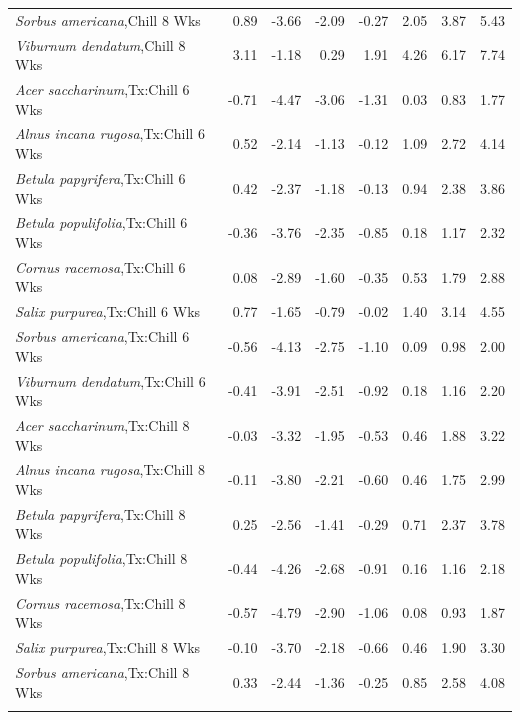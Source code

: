 \documentclass{article}\usepackage[]{graphicx}\usepackage[]{color}
\begin{document}
\begin{longtable}{lrrrrrrr}
  \textit{Sorbus americana},Chill 8 Wks & 0.89 & -3.66 & -2.09 & -0.27 & 2.05 & 3.87 & 5.43 \\ 
  \textit{Viburnum dendatum},Chill 8 Wks & 3.11 & -1.18 & 0.29 & 1.91 & 4.26 & 6.17 & 7.74 \\ 
  \textit{Acer saccharinum},Tx:Chill 6 Wks & -0.71 & -4.47 & -3.06 & -1.31 & 0.03 & 0.83 & 1.77 \\ 
  \textit{Alnus incana rugosa},Tx:Chill 6 Wks & 0.52 & -2.14 & -1.13 & -0.12 & 1.09 & 2.72 & 4.14 \\ 
  \textit{Betula papyrifera},Tx:Chill 6 Wks & 0.42 & -2.37 & -1.18 & -0.13 & 0.94 & 2.38 & 3.86 \\ 
  \textit{Betula populifolia},Tx:Chill 6 Wks & -0.36 & -3.76 & -2.35 & -0.85 & 0.18 & 1.17 & 2.32 \\ 
  \textit{Cornus racemosa},Tx:Chill 6 Wks & 0.08 & -2.89 & -1.60 & -0.35 & 0.53 & 1.79 & 2.88 \\ 
  \textit{Salix purpurea},Tx:Chill 6 Wks & 0.77 & -1.65 & -0.79 & -0.02 & 1.40 & 3.14 & 4.55 \\ 
  \textit{Sorbus americana},Tx:Chill 6 Wks & -0.56 & -4.13 & -2.75 & -1.10 & 0.09 & 0.98 & 2.00 \\ 
  \textit{Viburnum dendatum},Tx:Chill 6 Wks & -0.41 & -3.91 & -2.51 & -0.92 & 0.18 & 1.16 & 2.20 \\ 
  \textit{Acer saccharinum},Tx:Chill 8 Wks & -0.03 & -3.32 & -1.95 & -0.53 & 0.46 & 1.88 & 3.22 \\ 
  \textit{Alnus incana rugosa},Tx:Chill 8 Wks & -0.11 & -3.80 & -2.21 & -0.60 & 0.46 & 1.75 & 2.99 \\ 
  \textit{Betula papyrifera},Tx:Chill 8 Wks & 0.25 & -2.56 & -1.41 & -0.29 & 0.71 & 2.37 & 3.78 \\ 
  \textit{Betula populifolia},Tx:Chill 8 Wks & -0.44 & -4.26 & -2.68 & -0.91 & 0.16 & 1.16 & 2.18 \\ 
  \textit{Cornus racemosa},Tx:Chill 8 Wks & -0.57 & -4.79 & -2.90 & -1.06 & 0.08 & 0.93 & 1.87 \\ 
  \textit{Salix purpurea},Tx:Chill 8 Wks & -0.10 & -3.70 & -2.18 & -0.66 & 0.46 & 1.90 & 3.30 \\ 
  \textit{Sorbus americana},Tx:Chill 8 Wks & 0.33 & -2.44 & -1.36 & -0.25 & 0.85 & 2.58 & 4.08 \\ 
   \hline
\hline
\label{tab:suppmoddvr}
\end{longtable}
\end{document}
